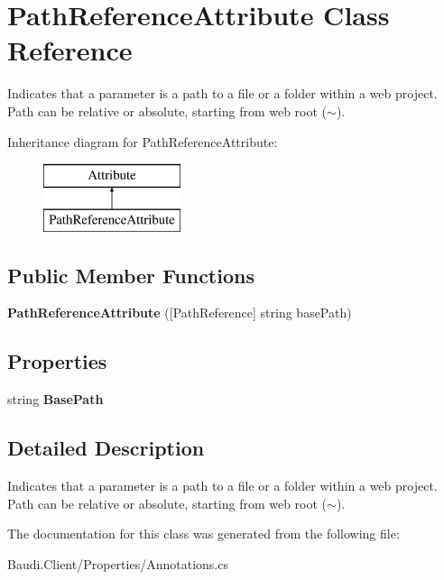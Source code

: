 \hypertarget{class_path_reference_attribute}{}\section{Path\+Reference\+Attribute Class Reference}
\label{class_path_reference_attribute}


Indicates that a parameter is a path to a file or a folder within a web project. Path can be relative or absolute, starting from web root ($\sim$).  


Inheritance diagram for Path\+Reference\+Attribute\+:\begin{figure}[H]
\begin{center}
\leavevmode
\includegraphics[height=2.000000cm]{class_path_reference_attribute}
\end{center}
\end{figure}
\subsection*{Public Member Functions}
\begin{DoxyCompactItemize}
\item 
\hypertarget{class_path_reference_attribute_a68daaaec94376b8e988ddcfd72229030}{}{\bfseries Path\+Reference\+Attribute} (\mbox{[}Path\+Reference\mbox{]} string base\+Path)\label{class_path_reference_attribute_a68daaaec94376b8e988ddcfd72229030}

\end{DoxyCompactItemize}
\subsection*{Properties}
\begin{DoxyCompactItemize}
\item 
\hypertarget{class_path_reference_attribute_ae6cf5aa92a7198b24c0656f974c3738d}{}string {\bfseries Base\+Path}\label{class_path_reference_attribute_ae6cf5aa92a7198b24c0656f974c3738d}

\end{DoxyCompactItemize}


\subsection{Detailed Description}
Indicates that a parameter is a path to a file or a folder within a web project. Path can be relative or absolute, starting from web root ($\sim$). 



The documentation for this class was generated from the following file\+:\begin{DoxyCompactItemize}
\item 
Baudi.\+Client/\+Properties/Annotations.\+cs\end{DoxyCompactItemize}
